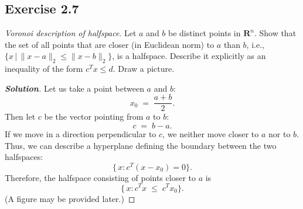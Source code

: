 \documentclass[12pt]{article}
\newenvironment{Solution}
  {\begin{proof}[\textbf{Solution}]}
  {\end{proof}}
\begin{document}
\vspace{0.15in}

\subsection*{Exercise 2.7}
\textit{Voronoi description of halfspace}. Let \(a\) and \(b\) be distinct points in $\mathbf{R}^n$.
Show that the set of all points that are closer (in Euclidean norm) to \(a\) than \(b\), i.e., $\{x \, | \, \| x - a \|_2 \leq \| x - b \|_2\}$,
is a halfspace. Describe it explicitly as an inequality of the form $c^T x \leq d$. Draw a picture.
\begin{Solution}
	Let us take a point between \(a\) and \(b\):
	\[
		x_0 \;=\; \frac{a+b}{2}.
	\]
	Then let \(c\) be the vector pointing from \(a\) to \(b\):
	\[
		c \;=\; b - a.
	\]
	If we move in a direction perpendicular to \(c\), we neither move closer to \(a\) nor to \(b\). Thus, we can describe a hyperplane defining the boundary between the two halfspaces:
	\[
		\{\,x : c^T (x - x_0) = 0\}.
	\]
	Therefore, the halfspace consisting of points closer to \(a\) is
	\[
		\{\,x : c^T x \;\le\; c^T x_0\}.
	\]
	(A figure may be provided later.)
\end{Solution}
\end{document}
